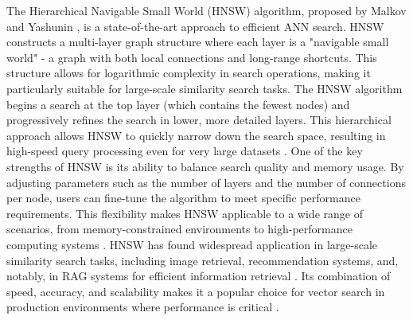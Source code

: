 \documentclass[a4paper, oneside]{discothesis}
\begin{document}
The Hierarchical Navigable Small World (HNSW) algorithm, proposed by Malkov and Yashunin \cite{malkov2018efficient}, is a state-of-the-art approach to efficient ANN search. HNSW constructs a multi-layer graph structure where each layer is a "navigable small world" - a graph with both local connections and long-range shortcuts. This structure allows for logarithmic complexity in search operations, making it particularly suitable for large-scale similarity search tasks.
The HNSW algorithm begins a search at the top layer (which contains the fewest nodes) and progressively refines the search in lower, more detailed layers. This hierarchical approach allows HNSW to quickly narrow down the search space, resulting in high-speed query processing even for very large datasets \cite{malkov2018efficient}.
One of the key strengths of HNSW is its ability to balance search quality and memory usage. By adjusting parameters such as the number of layers and the number of connections per node, users can fine-tune the algorithm to meet specific performance requirements. This flexibility makes HNSW applicable to a wide range of scenarios, from memory-constrained environments to high-performance computing systems \cite{malkov2018efficient}.
HNSW has found widespread application in large-scale similarity search tasks, including image retrieval, recommendation systems, and, notably, in RAG systems for efficient information retrieval \cite{johnson2019billion}. Its combination of speed, accuracy, and scalability makes it a popular choice for vector search in production environments where performance is critical \cite{malkov2018efficient}.
\end{document}
